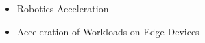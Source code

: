 \begin{itemize}
    \item Robotics Acceleration
    \item Acceleration of Workloads on Edge Devices
\end{itemize}
